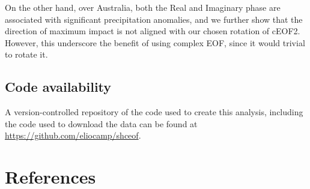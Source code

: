 \documentclass[smallextended]{svjour3}       %
\begin{document}
On the other hand, over Australia, both the Real and Imaginary phase are associated with significant precipitation anomalies, and we further show that the direction of maximum impact is not aligned with our chosen rotation of cEOF2. However, this underscore the benefit of using complex EOF, since it would trivial to rotate it.

\hypertarget{code-availability}{%
\subsection*{Code availability}\label{code-availability}}

A version-controlled repository of the code used to create this analysis, including the code used to download the data can be found at \url{https://github.com/eliocamp/shceof}.

\hypertarget{references}{%
\section{References}\label{references}}




\end{document}
